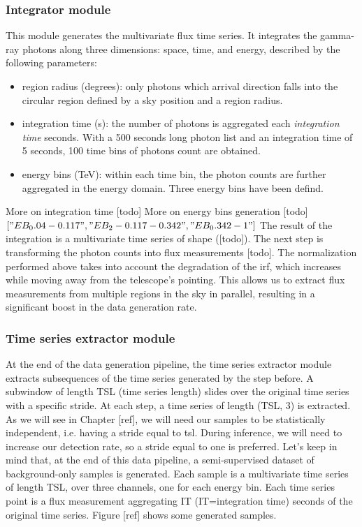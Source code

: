 \subsubsection{Integrator module}
This module generates the multivariate flux time series. It integrates the gamma-ray photons along three dimensions: space, time, and energy, described by the following parameters:
\begin{itemize}
    \item region radius (degrees): only photons which arrival direction falls into the circular region defined by a sky position and a region radius.
    \item integration time (s): the number of photons is aggregated each \textit{integration time} seconds. With a 500 seconds long photon list and an integration time of 5 seconds, 100 time bins of photons count are obtained. 
    \item energy bins (TeV): within each time bin, the photon counts are further aggregated in the energy domain. Three energy bins have been defind.
\end{itemize}

More on integration time [todo]
More on energy bins generation [todo]  $["EB_0.04-0.117","EB_2-0.117-0.342","EB_0.342-1"]$
The result of the integration is a multivariate time series of shape ([todo]). The next step is transforming the photon counts into flux measurements [todo]. 
The normalization performed above takes into account the degradation of the irf, which increases while moving away from the telescope's pointing. This allows us to extract flux measurements from multiple regions in the sky in parallel, resulting in a significant boost in the data generation rate.  

\subsubsection{Time series extractor module}
At the end of the data generation pipeline, the time series extractor module extracts subsequences of the time series generated by the step before. A subwindow of length TSL (time series length) slides over the original time series with a specific stride. At each step, a time series of length (TSL, 3) is extracted. 
As we will see in Chapter [ref], we will need our samples to be statistically independent, i.e. having a stride equal to tsl. During inference, we will need to increase our detection rate, so a stride equal to one is preferred. Let's keep in mind that, at the end of this data pipeline, a semi-supervised dataset of background-only samples is generated. Each sample is a multivariate time series of length TSL, over three channels, one for each energy bin. Each time series point is a flux measurement aggregating IT (IT=integration time) seconds of the original time series. Figure [ref] shows some generated samples.

